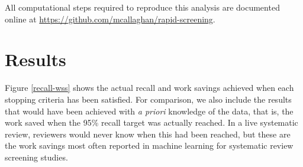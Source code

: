 \documentclass{bmcart}
\begin{document}
	
	All computational steps required to reproduce this analysis are documented online at \url{https://github.com/mcallaghan/rapid-screening}.
	
	\section*{Results}
	
	Figure \ref{recall-wss} shows the actual recall and work savings achieved when each stopping criteria has been satisfied. 
	For comparison, we also include the results that would have been achieved with \textit{a priori} knowledge of the data, that is, the work saved when the 95\% recall target was actually reached. In a live systematic review, reviewers would never know when this had been reached, but these are the work savings most often reported in machine learning for systematic review screening studies.
	
\end{document}
